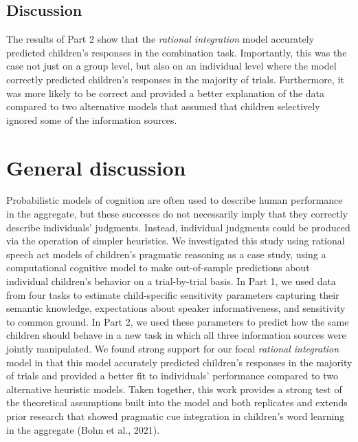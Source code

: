 \documentclass[
  man,floatsintext]{apa6}
\begin{document}
\hypertarget{discussion-1}{%
\subsection{Discussion}\label{discussion-1}}

The results of Part 2 show that the \emph{rational integration} model accurately predicted children's responses in the combination task. Importantly, this was the case not just on a group level, but also on an individual level where the model correctly predicted children's responses in the majority of trials. Furthermore, it was more likely to be correct and provided a better explanation of the data compared to two alternative models that assumed that children selectively ignored some of the information sources.

\hypertarget{general-discussion}{%
\section{General discussion}\label{general-discussion}}

Probabilistic models of cognition are often used to describe human performance in the aggregate, but these successes do not necessarily imply that they correctly describe individuals' judgments. Instead, individual judgments could be produced via the operation of simpler heuristics. We investigated this study using rational speech act models of children's pragmatic reasoning as a case study, using a computational cognitive model to make out-of-sample predictions about individual children's behavior on a trial-by-trial basis. In Part 1, we used data from four tasks to estimate child-specific sensitivity parameters capturing their semantic knowledge, expectations about speaker informativeness, and sensitivity to common ground. In Part 2, we used these parameters to predict how the same children should behave in a new task in which all three information sources were jointly manipulated. We found strong support for our focal \emph{rational integration} model in that this model accurately predicted children's responses in the majority of trials and provided a better fit to individuals' performance compared to two alternative heuristic models. Taken together, this work provides a strong test of the theoretical assumptions built into the model and both replicates and extends prior research that showed pragmatic cue integration in children's word learning in the aggregate (Bohn et al., 2021).
\end{document}
